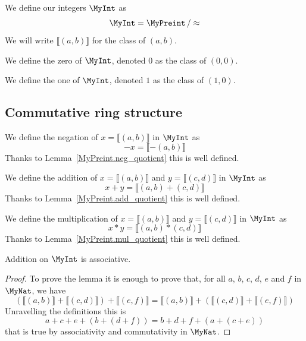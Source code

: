\begin{definition}
    \label{MyInt}
    \leanok
    We define our integers $\MyInt$ as
\[
\MyInt = \MyPreint \, / \approx
\]
We will write $⟦ (a, b) ⟧$ for the class of $(a,b)$.
\end{definition}

\begin{definition}
    \label{MyInt.zero}
    \leanok
We define the zero of $\MyInt$, denoted $0$ as the class of $(0,0)$.
\end{definition}

\begin{definition}
    \label{MyInt.one}
    \leanok
We define the one of $\MyInt$, denoted $1$ as the class of $(1,0)$.
\end{definition}

\subsection{Commutative ring structure}

\begin{definition}
    \label{MyInt.neg}
    \leanok
We define the negation of $x = ⟦ (a, b) ⟧$ in $\MyInt$ as
\[
-x = ⟦ -(a, b) ⟧
\]
Thanks to Lemma~\ref{MyPreint.neg_quotient} this is well defined.
\end{definition}

\begin{definition}
    \label{MyInt.add}
    \leanok
We define the addition of $x = ⟦ (a, b) ⟧$ and $y = ⟦ (c, d) ⟧$ in $\MyInt$ as
\[
x + y = ⟦ (a, b)+(c,d) ⟧
\]
Thanks to Lemma~\ref{MyPreint.add_quotient} this is well defined.
\end{definition}

\begin{definition}
    \label{MyInt.mul}
    \leanok
We define the multiplication of $x = ⟦ (a, b) ⟧$ and $y = ⟦ (c, d) ⟧$ in $\MyInt$ as
\[
x * y = ⟦ (a, b)*(c,d) ⟧
\]
Thanks to Lemma~\ref{MyPreint.mul_quotient} this is well defined.
\end{definition}

\begin{lemma}
    \label{MyInt.add_assoc}
    \leanok
    Addition on $\MyInt$ is associative.
\end{lemma}
\begin{proof}
    \leanok
To prove the lemma it is enough to prove that, for all $a$, $b$, $c$, $d$, $e$ and $f$ in $\MyNat$, we have
\[
(⟦ (a, b) ⟧+ ⟦ (c, d) ⟧) + ⟦ (e, f) ⟧ = ⟦ (a, b) ⟧ + (⟦ (c, d) ⟧ + ⟦ (e, f) ⟧)
\]
Unravelling the definitions this is
\[
a + c + e + (b + (d + f)) = b + d + f + (a + (c + e))
\]
that is true by associativity and commutativity in $\MyNat$.
\end{proof}

